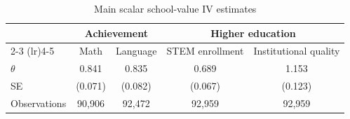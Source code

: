 \begin{table}[!htbp]
\centering
\caption{Main scalar school-value IV estimates}
\label{tab:main-four-va-results}
\begin{tabular}{lcccc}
\toprule
 & \multicolumn{2}{c}{Achievement} & \multicolumn{2}{c}{Higher education} \\
\cmidrule(lr){2-3} \cmidrule(lr){4-5}
 & Math & Language & STEM enrollment & Institutional quality \\
\midrule
$\theta$ & 0.841 & 0.835 & 0.689 & 1.153 \\
SE & (0.071) & (0.082) & (0.067) & (0.123) \\
Observations & 90,906 & 92,472 & 92,959 & 92,959 \\
\bottomrule
\end{tabular}
\end{table}
